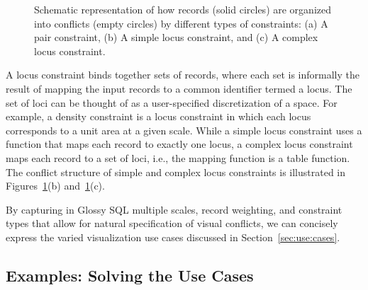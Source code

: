 \documentclass[11pt, oneside]{report}
\begin{document}
\begin{figure}[t]
\centering
{}
\vspace{-2ex}
\caption{Schematic representation of how records (solid circles) are organized into conflicts (empty circles) by different types of constraints: (a) A pair constraint, (b) A simple locus constraint, and (c) A complex locus constraint.} 
\label{fig:constraints:schematic}
\vspace{-2ex}
\end{figure}

A locus constraint binds together sets of records, where each set is informally the result of mapping the input records to a common identifier termed a locus. The set of loci can be thought of as a user-specified discretization of a space. For example, a density constraint is a locus constraint in which each locus corresponds to a unit area at a given scale. While a simple locus constraint uses a function that maps each record to exactly one locus, a complex locus constraint maps each record to a set of loci, i.e., the mapping function is a table function. The conflict structure of simple and complex locus constraints is illustrated in Figures~\ref{fig:constraints:schematic}(b) and~\ref{fig:constraints:schematic}(c).

By capturing in Glossy SQL multiple scales, record weighting, and constraint types that allow for natural specification of visual conflicts, we can concisely express the varied visualization use cases discussed in Section~\ref{sec:use:cases}.

\subsection{Examples: Solving the Use Cases}
\label{sec:use:cases:solved}
\end{document}
